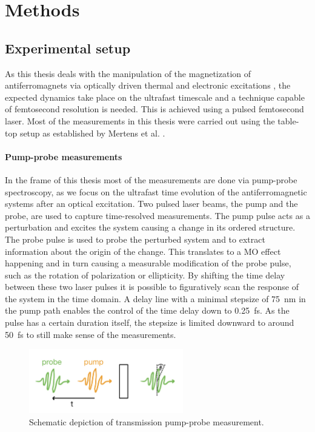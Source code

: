 \chapter{Methods}
\section{Experimental setup}
As this thesis deals with the manipulation of the magnetization of antiferromagnets via optically driven thermal and electronic excitations \cite{song_how_2018}, the expected dynamics take place on the ultrafast timescale and a technique capable of femtosecond resolution is needed.
This is achieved using a pulsed femtosecond laser.
Most of the measurements in this thesis were carried out using the table-top setup as established by Mertens et al. \cite{mertens_wide_2020}.

\subsubsection*{Pump-probe measurements}
In the frame of this thesis most of the measurements are done via pump-probe spectroscopy, as we focus on the ultrafast time evolution of the antiferromagnetic systems after an optical excitation.
Two pulsed laser beams, the pump and the probe, are used to capture time-resolved measurements.
The pump pulse acts as a perturbation and excites the system causing a change in its ordered structure.
The probe pulse is used to probe the perturbed system and to extract information about the origin of the change. 
This translates to a MO effect happening and in turn causing a measurable modification of the probe pulse, such as the rotation of polarization or ellipticity.
By shifting the time delay between these two laser pulses it is possible to figuratively scan the response of the system in the time domain.
A delay line with a minimal stepsize of \qty{75}{nm} in the pump path enables the control of the time delay down to \qty{0.25}{fs}.
As the pulse has a certain duration itself, the stepsize is limited downward to around \qty{50}{fs} to still make sense of the measurements.
\begin{figure}[ht]
    \centering
    \includegraphics[width=0.6\textwidth]{pictures/pump_probe.jpeg}
    \caption{Schematic depiction of transmission pump-probe measurement.}
    \label{fig:pump_probe}
\end{figure}

